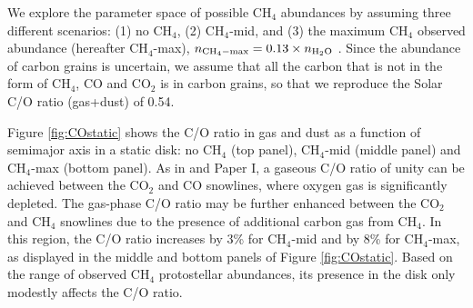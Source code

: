 \documentclass[apj]{emulateapj}
\begin{document}

We explore the parameter space of possible CH$_4$ abundances by assuming three different scenarios: (1) no CH$_4$, (2) CH$_4$-mid, and (3) the maximum CH$_4$ observed abundance (hereafter CH$_4$-max), $n_{\rm CH_4-max}=0.13 \times n_{\rm H_2O}$ \citep{oberg08}. %
Since the abundance of carbon grains is uncertain, we assume that all the carbon that is not in the form of CH$_4$, CO and CO$_2$ is in carbon grains, so that we reproduce the Solar C/O ratio (gas+dust) of 0.54.  

Figure \ref{fig:COstatic} shows the C/O ratio in gas and dust as a function of semimajor axis in a static disk: no CH$_4$ (top panel), CH$_4$-mid (middle panel) and CH$_4$-max (bottom panel). As in \citet{oberg11} and Paper I, a gaseous C/O ratio of unity can be achieved between the CO$_2$ and CO snowlines, where oxygen gas is significantly depleted. The gas-phase C/O ratio may be further enhanced between the CO$_2$ and CH$_4$ snowlines due to the presence of additional carbon gas from CH$_4$. In this region, the C/O ratio increases by 3\% for CH$_4$-mid and by 8\% for CH$_4$-max, as displayed in the middle and bottom panels of Figure \ref{fig:COstatic}. Based on the range of observed CH$_4$ protostellar abundances, its presence in the disk only modestly affects the C/O ratio. %
\end{document}
